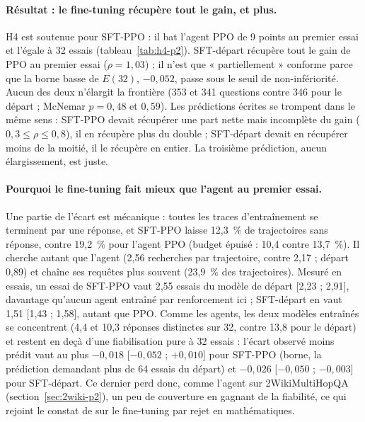 \paragraph{Résultat : le fine-tuning récupère tout le gain, et plus.} H4 est soutenue pour SFT-PPO : il bat l'agent PPO de 9 points au premier essai et l'égale à 32 essais (tableau~\ref{tab:h4-p2}). SFT-départ récupère tout le gain de PPO au premier essai ($\rho = 1{,}03$) ; il n'est que « partiellement » conforme parce que la borne basse de $E(32)$, $-0{,}052$, passe sous le seuil de non-infériorité. Aucun des deux n'élargit la frontière (353 et 341 questions contre 346 pour le départ ; McNemar $p = 0{,}48$ et $0{,}59$). Les prédictions écrites se trompent dans le même sens : SFT-PPO devait récupérer une part nette mais incomplète du gain ($0{,}3 \le \rho \le 0{,}8$), il en récupère plus du double ; SFT-départ devait en récupérer moins de la moitié, il le récupère en entier. La troisième prédiction, aucun élargissement, est juste.

\paragraph{Pourquoi le fine-tuning fait mieux que l'agent au premier essai.} Une partie de l'écart est mécanique : toutes les traces d'entraînement se terminent par une réponse, et SFT-PPO laisse 12,3~\% de trajectoires sans réponse, contre 19,2~\% pour l'agent PPO (budget épuisé : 10,4 contre 13,7~\%). Il cherche autant que l'agent (2,56 recherches par trajectoire, contre 2,17 ; départ 0,89) et chaîne ses requêtes plus souvent (23,9~\% des trajectoires). Mesuré en essais, un essai de SFT-PPO vaut 2,55 essais du modèle de départ [2,23 ; 2,91], davantage qu'aucun agent entraîné par renforcement ici ; SFT-départ en vaut 1,51 [1,43 ; 1,58], autant que PPO. Comme les agents, les deux modèles entraînés se concentrent (4,4 et 10,3 réponses distinctes sur 32, contre 13,8 pour le départ) et restent en deçà d'une fiabilisation pure à 32 essais : l'écart observé moins prédit vaut au plus $-0{,}018$ [$-0{,}052$ ; $+0{,}010$] pour SFT-PPO (borne, la prédiction demandant plus de 64 essais du départ) et $-0{,}026$ [$-0{,}050$ ; $-0{,}003$] pour SFT-départ. Ce dernier perd donc, comme l'agent sur 2WikiMultiHopQA (section~\ref{sec:2wiki-p2}), un peu de couverture en gagnant de la fiabilité, ce qui rejoint le constat de \citet{rath2026passk} sur le fine-tuning par rejet en mathématiques.

